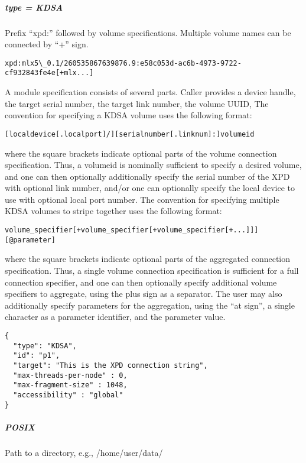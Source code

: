 \subparagraph{type = KDSA}

Prefix ``xpd:'' followed by volume specifications. Multiple volume names can be connected by ``+'' sign.

\begin{lstlisting}
xpd:mlx5\_0.1/260535867639876.9:e58c053d-ac6b-4973-9722-cf932843fe4e[+mlx...]
\end{lstlisting}

A module specification consists of several parts.
Caller provides a device handle, the target serial number, the target link number, the volume UUID,
The convention for specifying a KDSA volume uses the following format:

\begin{lstlisting}
[localdevice[.localport]/][serialnumber[.linknum]:]volumeid
\end{lstlisting}

where the square brackets indicate optional parts of the volume connection specification.
Thus, a volumeid is nominally sufficient to specify a desired volume, and one can then optionally additionally 
specify the serial number of the XPD with optional link number, and/or one can optionally specify the local 
device to use with optional local port number.
The convention for specifying multiple KDSA volumes to stripe together uses the following format:

\begin{lstlisting}
volume_specifier[+volume_specifier[+volume_specifier[+...]]][@parameter]
\end{lstlisting}

where the square brackets indicate optional parts of the aggregated connection specification. Thus, a single
volume connection specification is sufficient for a full connection specifier, and one can then optionally specify
additional volume specifiers to aggregate, using the plus sign as a separator. The user may also additionally
specify parameters for the aggregation, using the “at sign”, a single character as a parameter identifier, and the
parameter value.

\begin{lstlisting}
{
  "type": "KDSA",
  "id": "p1",
  "target": "This is the XPD connection string",
  "max-threads-per-node" : 0,
  "max-fragment-size" : 1048,
  "accessibility" : "global"
}
\end{lstlisting}

\subparagraph{POSIX}

Path to a directory, e.g., /home/user/data/


